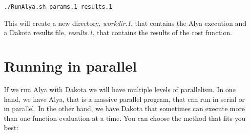 \documentclass[12pt,a4paper,article]{memoir}
\begin{document}
\begin{lstlisting}[style=MyCodeStyle,language=bash]
./RunAlya.sh params.1 results.1
\end{lstlisting}

This will create a new directory, \textit{workdir.1}, that contains the Alya execution and a Dakota results file, \textit{results.1}, that contains the results of the cost function.

\chapter{Running in parallel}
If we run Alya with Dakota we will have multiple levels of parallelism. In one hand, we have Alya, that is a massive parallel program, that can run in serial or in parallel. In the other hand, we have Dakota that sometimes can execute more than one function evaluation at a time. You can choose the method that fits you best:
\end{document}

